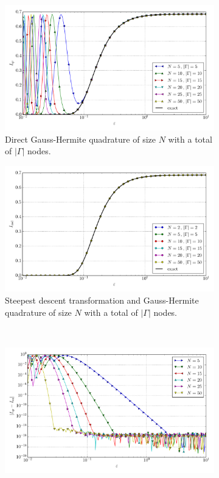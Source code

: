 \documentclass[a4paper,10pt]{article}
\begin{document}
\begin{figure}[ht!]
  \begin{subfigure}[t]{0.5\linewidth}
    \includegraphics[width=\linewidth]{./plots/tp_1d_conv_eps_0_0_val_qr.pdf}
    \caption{Direct Gauss-Hermite quadrature of size $N$ with a total of $|\Gamma|$ nodes.}
    \label{fig:tp_1d_conv_eps_0_0_val_qr}
  \end{subfigure}
  \begin{subfigure}[t]{0.5\linewidth}
    \includegraphics[width=\linewidth]{./plots/tp_1d_conv_eps_0_0_val_nsd.pdf}
    \caption{Steepest descent transformation and Gauss-Hermite quadrature of size $N$ with a total of $|\Gamma|$ nodes.}
    \label{fig:tp_1d_conv_eps_0_0_val_nsd}
  \end{subfigure} \\
  \begin{subfigure}[t]{0.5\linewidth}
    \includegraphics[width=\linewidth]{./plots/tp_1d_conv_eps_0_0_err_qr.pdf}

\end{subfigure}
\end{figure}
\end{document}
